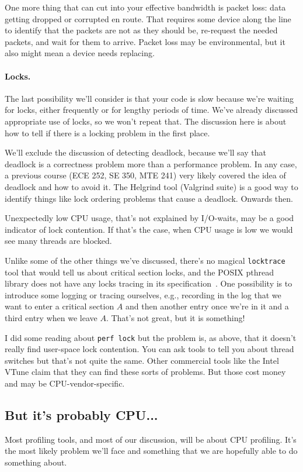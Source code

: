 One more thing that can cut into your effective bandwidth is packet loss: data getting dropped or corrupted en route. That requires some device along the line to identify that the packets are not as they should be, re-request the needed packets, and wait for them to arrive. Packet loss may be environmental, but it also might mean a device needs replacing.

\paragraph{Locks.}
The last possibility we'll consider is that your code is slow because we're waiting for locks, either frequently or for lengthy periods of time. We've already discussed appropriate use of locks, so we won't repeat that. The discussion here is about how to tell if there is a locking problem in the first place.

We'll exclude the discussion of detecting deadlock, because we'll say that deadlock is a correctness problem more than a performance problem. In any case, a previous course (ECE 252, SE 350, MTE 241) very likely covered the idea of deadlock and how to avoid it. The Helgrind tool (Valgrind suite) is a good way to identify things like lock ordering problems that cause a deadlock. Onwards then. 

Unexpectedly low CPU usage, that's not explained by I/O-waits, may be a good indicator of lock contention. If that's the case, when CPU usage is low we would see many threads are blocked. 

Unlike some of the other things we've discussed, there's no magical \texttt{locktrace} tool that would tell us about critical section locks, and the POSIX pthread library does not have any locks tracing in its specification~\cite{usd}. One possibility is to introduce some logging or tracing ourselves, e.g., recording in the log that we want to enter a critical section $A$ and then another entry once we're in it and a third entry when we leave $A$. That's not great, but it is something! 

I did some reading about \texttt{perf lock} but the problem is, as above, that it doesn't really find user-space lock contention. You can ask tools to tell you about thread switches but that's not quite the same. Other commercial tools like the Intel VTune claim that they can find these sorts of problems. But those cost money and may be CPU-vendor-specific.


\subsection*{But it's probably CPU...}
Most profiling tools, and most of our discussion, will be about CPU profiling. It's the most likely problem we'll face and something that we are hopefully able to do something about. 






